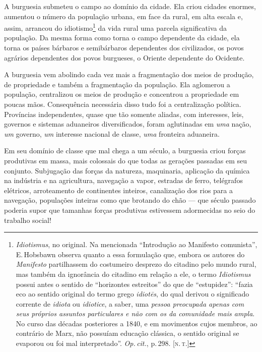 A burguesia submeteu o campo ao domínio da cidade. Ela criou
cidades enormes, aumentou o número da população urbana, em face da
rural, em alta escala e, assim, arrancou do
idiotismo\footnote{\textit{Idiotismus}, no original. Na mencionada ``Introdução
ao Manifesto comunista'', E.\,Hobsbawn observa quanto a essa formulação que,
embora os autores do \textit{Manifesto} partilhassem do costumeiro
desprezo do citadino pelo mundo rural, mas também da ignorância do
citadino em relação a ele, o termo \textit{Idiotismus} possui
antes o sentido de ``horizontes estreitos'' do que de ``estupidez'': ``fazia
eco ao sentido original do termo grego \textit{idiot\=es}, do qual derivou o
significado corrente de \textit{idiota} ou \textit{idiotice}, a saber, uma \textit{pessoa
preocupada apenas com seus próprios assuntos particulares e não com os
da comunidade mais ampla}. No curso das décadas posteriores a 1840, e
em movimentos cujos membros, ao contrário de Marx, não possuíam
educação clássica, o sentido original se evaporou ou foi mal
interpretado''. \textit{Op.\,cit.}, p.\,298. [\textsc{n.\,t.}]}
da vida rural uma parcela significativa da população. Da mesma
forma como torna o campo dependente da cidade, ela torna os países
bárbaros e semibárbaros dependentes dos civilizados, os povos agrários
dependentes dos povos burgueses, o Oriente dependente do Ocidente.

A burguesia vem abolindo cada vez mais a fragmentação dos meios de
produção, de propriedade e também a fragmentação da população. Ela
aglomerou a população, centralizou os meios de produção e concentrou a
propriedade em poucas mãos. Consequência necessária disso tudo foi a
centralização política. Províncias independentes, quase que
tão somente aliadas, com interesses, leis, governos e sistemas
aduaneiros diversificados, foram aglutinadas em \textit{uma} nação,
\textit{um} governo, \textit{um} interesse nacional de classe,
\textit{uma} fronteira aduaneira.

Em seu domínio de classe que mal chega a um século, a burguesia criou
forças produtivas em massa, mais colossais do que todas as gerações
passadas em seu conjunto. Subjugação das forças da natureza,
maquinaria, aplicação da química na indústria e na agricultura,
navegação a vapor, estradas de ferro, telégrafos elétricos,
arroteamento de continentes inteiros, canalização dos rios para a
navegação, populações inteiras como que brotando do chão  ---  que século
passado poderia supor que tamanhas forças produtivas estivessem
adormecidas no seio do trabalho social!

